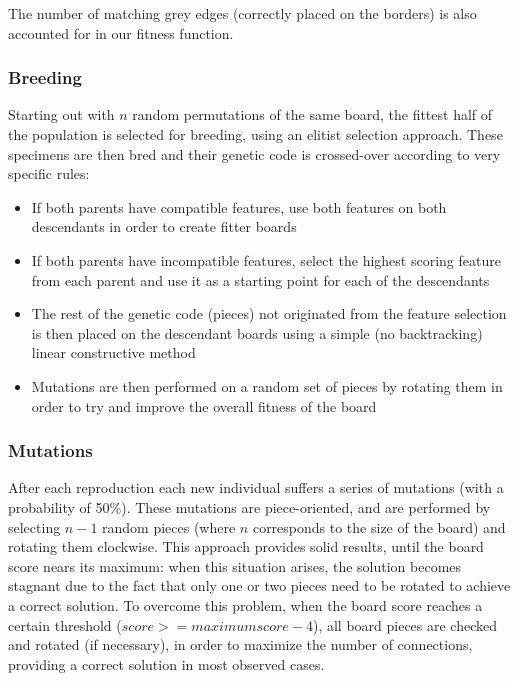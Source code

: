 \documentclass{llncs}
\begin{document}
The number of matching grey edges (correctly placed on the borders) is also accounted for in our fitness function.

\subsubsection{Breeding}

Starting out with $n$ random permutations of the same board, the fittest half of the population is selected for breeding, using an elitist selection approach. These specimens are then bred and their genetic code is crossed-over according to very specific rules:

\begin{itemize}
  \item If both parents have compatible features, use both features on both descendants in order to create fitter boards
  \item If both parents have incompatible features, select the highest scoring feature from each parent and use it as a starting point for each of the descendants
  \item The rest of the genetic code (pieces) not originated from the feature selection is then placed on the descendant boards using a simple (no backtracking) linear constructive method
  \item Mutations are then performed on a random set of pieces by rotating them in order to try and improve the overall fitness of the board
\end{itemize}

\subsubsection{Mutations}\label{sec:mutations}

After each reproduction each new individual suffers a series of mutations (with a probability of 50\%). These mutations are piece-oriented, and are performed by selecting $n-1$ random pieces (where $n$ corresponds to the size of the board) and rotating them clockwise. This approach provides solid results, until the board score nears its maximum: when this situation arises, the solution becomes stagnant due to the fact that only one or two pieces need to be rotated to achieve a correct solution. To overcome this problem, when the board score reaches a certain threshold ($score >= maximum score - 4$), all board pieces are checked and rotated (if necessary), in order to maximize the number of connections, providing a correct solution in most observed cases.
\end{document}
